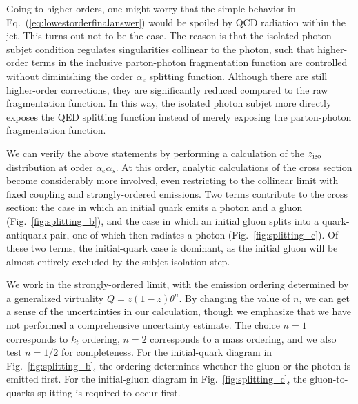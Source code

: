 \documentclass[a4paper,11pt]{article}
\DeclareRobustCommand{\Fig}[1]{Fig.~\ref{#1}}
\DeclareRobustCommand{\Eq}[1]{Eq.~(\ref{#1})}
\newcommand{\ziso}{z_{\rm iso}}
\begin{document}
Going to higher orders, one might worry that the simple behavior in \Eq{eq:lowestorderfinalanswer} would be spoiled by QCD radiation within the jet.
%
This turns out not to be the case.
%
The reason is that the isolated photon subjet condition regulates singularities collinear to the photon, such that higher-order terms in the inclusive parton-photon fragmentation function are controlled without diminishing the order $\alpha_e$ splitting function.
%
Although there are still higher-order corrections, they are significantly reduced compared to the raw fragmentation function. 
%
In this way, the isolated photon subjet more directly exposes the QED splitting function instead of merely exposing the parton-photon fragmentation function.

We can verify the above statements by performing a calculation of the $\ziso$ distribution at order $\alpha_e \alpha_s$.
%
At this order, analytic calculations of the cross section become considerably more involved, even restricting to the collinear limit with fixed coupling and strongly-ordered emissions.
%
Two terms contribute to the cross section: the case in which an initial quark emits a photon and a gluon (\Fig{fig:splitting_b}), and the case in which an initial gluon splits into a quark-antiquark pair, one of which then radiates a photon (\Fig{fig:splitting_c}).
%
Of these two terms, the initial-quark case is dominant, as the initial gluon will be almost entirely excluded by the subjet isolation step.

We work in the strongly-ordered limit, with the emission ordering determined by a generalized virtuality $Q = z(1 - z)\theta^n$.
%
By changing the value of $n$, we can get a sense of the uncertainties in our calculation, though we emphasize that we have not performed a comprehensive uncertainty estimate.
%
The choice $n = 1$ corresponds to $k_t$ ordering, $n = 2$ corresponds to a mass ordering, and we also test $n = 1/2$ for completeness.
%
For the initial-quark diagram in \Fig{fig:splitting_b}, the ordering determines whether the gluon or the photon is emitted first.
%
For the initial-gluon diagram in \Fig{fig:splitting_c}, the gluon-to-quarks splitting is required to occur first. 
\end{document}
